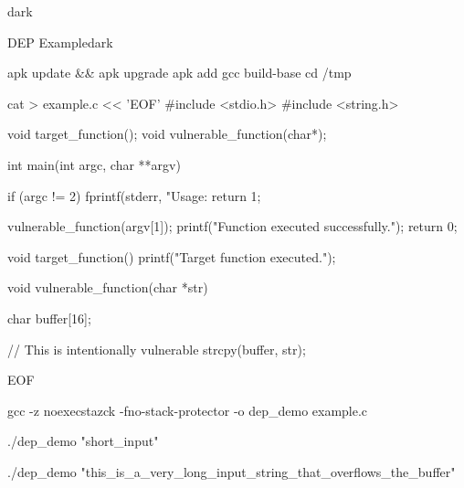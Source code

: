 \begin{baseBoxThree}{}{dark}
    \smallskip
    \begin{baseBoxThree}{DEP Example}{dark}
        \begin{posnex}
apk update && apk upgrade
apk add gcc build-base
cd /tmp

cat > example.c << 'EOF'
#include <stdio.h>
#include <string.h>

void target_function();
void vulnerable_function(char*);

int main(int argc, char **argv) {
        if (argc != 2) {
                fprintf(stderr, "Usage: %
                return 1;
        }
    
        vulnerable_function(argv[1]);
        printf("Function executed successfully.\n");
        return 0;
}

void target_function() {
        printf("Target function executed.\n");
}

void vulnerable_function(char *str) {
        char buffer[16];

        // This is intentionally vulnerable
        strcpy(buffer, str);
}
EOF

gcc -z noexecstazck -fno-stack-protector -o dep_demo example.c

./dep_demo "short_input"

./dep_demo "this_is_a_very_long_input_string_that_overflows_the_buffer"
        \end{posnex}
    \end{baseBoxThree}
    \smallskip
\end{baseBoxThree}